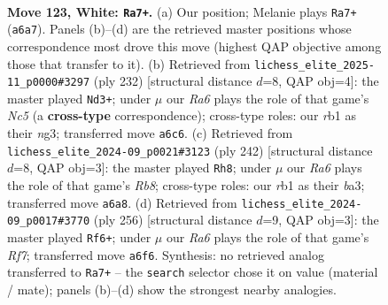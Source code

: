 \documentclass[11pt]{article}
\begin{document}
\clearpage

\begin{figure}[p]\centering
\begin{subfigure}{0.46\textwidth}\centering
\resizebox{\linewidth}{!}{%
\newchessgame
\chessboard[
  setfen={8/4k3/R7/5K2/6P1/8/8/1r2N3 w - - 29 123},
  showmover=false,
  pgfstyle=straightmove, color=movearrow, markmove={a6-a7}
]}
\caption{}
\end{subfigure}\hfill
\begin{subfigure}{0.46\textwidth}\centering
\resizebox{\linewidth}{!}{%
\newchessgame
\chessboard[
  setfen={8/5K2/6P1/2N1k3/8/6n1/8/8 w - - 99 117},
  showmover=false,
  pgfstyle=straightmove, color=movearrow, markmove={c5-d3}
]}
\caption{}
\end{subfigure}
\\[4pt]
\begin{subfigure}{0.46\textwidth}\centering
\resizebox{\linewidth}{!}{%
\newchessgame
\chessboard[
  setfen={1R6/5K2/6P1/8/8/b5n1/2k5/8 w - - 43 122},
  showmover=false,
  pgfstyle=straightmove, color=movearrow, markmove={b8-h8}
]}
\caption{}
\end{subfigure}\hfill
\begin{subfigure}{0.46\textwidth}\centering
\resizebox{\linewidth}{!}{%
\newchessgame
\chessboard[
  setfen={8/5R2/4k1K1/7P/8/8/8/1r6 w - - 3 129},
  showmover=false,
  pgfstyle=straightmove, color=movearrow, markmove={f7-f6}
]}
\caption{}
\end{subfigure}
\caption{\textbf{Move 123, White: \texttt{Ra7+}.} (a) Our position; Melanie plays \texttt{Ra7+} (\texttt{a6a7}). Panels (b)--(d) are the retrieved master positions whose correspondence most drove this move (highest QAP objective among those that transfer to it). (b) Retrieved from \texttt{lichess\_elite\_2025-11\_p0000\#3297} (ply 232) [structural distance $d$=8, QAP obj=4]: the master played \texttt{Nd3+}; under $\mu$ our \emph{Ra6} plays the role of that game's \emph{Nc5} (a \textbf{cross-type} correspondence); cross-type roles: our \emph{r}b1 as their \emph{n}g3; transferred move \texttt{a6c6}. (c) Retrieved from \texttt{lichess\_elite\_2024-09\_p0021\#3123} (ply 242) [structural distance $d$=8, QAP obj=3]: the master played \texttt{Rh8}; under $\mu$ our \emph{Ra6} plays the role of that game's \emph{Rb8}; cross-type roles: our \emph{r}b1 as their \emph{b}a3; transferred move \texttt{a6a8}. (d) Retrieved from \texttt{lichess\_elite\_2024-09\_p0017\#3770} (ply 256) [structural distance $d$=9, QAP obj=3]: the master played \texttt{Rf6+}; under $\mu$ our \emph{Ra6} plays the role of that game's \emph{Rf7}; transferred move \texttt{a6f6}. Synthesis: no retrieved analog transferred to \texttt{Ra7+} -- the \texttt{search} selector chose it on value (material / mate); panels (b)--(d) show the strongest nearby analogies.}
\label{fig:thought-m244}
\end{figure}
\end{document}
